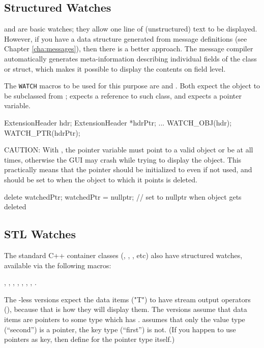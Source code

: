 \subsection{Structured Watches}

 and  are basic watches; they allow one
line of (unstructured) text to be displayed. However, if you have a
data structure generated from message definitions (see Chapter \ref{cha:messages}),
then there is a better approach. The message compiler automatically generates
meta-information describing individual fields of the class or struct,
which makes it possible to display the contents on field level.

The \texttt{WATCH} macros to be used for this purpose are 
and . Both expect the object to be subclassed from
;  expects a reference to such class,
and  expects a pointer variable.

\begin{cpp}
ExtensionHeader hdr;
ExtensionHeader *hdrPtr;
...
WATCH_OBJ(hdr);
WATCH_PTR(hdrPtr);
\end{cpp}

CAUTION: With , the pointer variable must point to a valid
object or be  at all times, otherwise the GUI may crash
while trying to display the object. This practically means that
the pointer should be initialized to  even if not used, and
should be set to  when the object to which it points is deleted.

\begin{cpp}
delete watchedPtr;
watchedPtr = nullptr;  // set to nullptr when object gets deleted
\end{cpp}


\subsection{STL Watches}

The standard C++ container classes (, , , etc)
also have structured watches, available via the following macros:

, ,
, ,
, ,
, .

The -less versions expect the data items ("T") to have
stream output operators (), because that is how
they will display them. The  versions assume that
data items are pointers to some type which has .
 assumes that only the value type (``second'')
is a pointer, the key type (``first'') is not. (If you happen to use
pointers as key, then define  for the pointer type
itself.)

